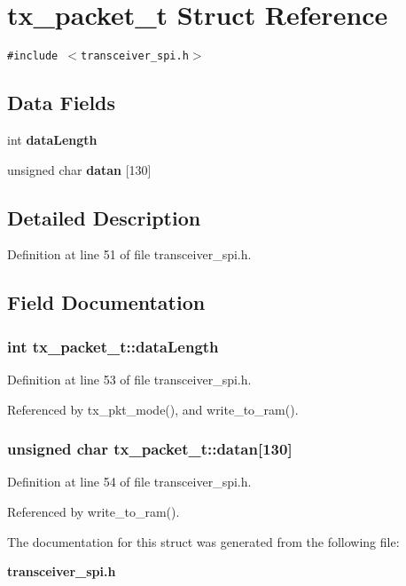 \section{tx\_\-packet\_\-t Struct Reference}
\label{structtx__packet__t}
{\tt \#include $<$transceiver\_\-spi.h$>$}

\subsection*{Data Fields}
\begin{CompactItemize}
\item 
int {\bf data\-Length}
\item 
unsigned char {\bf datan} [130]
\end{CompactItemize}


\subsection{Detailed Description}




Definition at line 51 of file transceiver\_\-spi.h.

\subsection{Field Documentation}
\subsubsection{\setlength{\rightskip}{0pt plus 5cm}int {\bf tx\_\-packet\_\-t::data\-Length}}\label{structtx__packet__t_1f14a5038a8cdc8ebc4d45e855f5921d}




Definition at line 53 of file transceiver\_\-spi.h.

Referenced by tx\_\-pkt\_\-mode(), and write\_\-to\_\-ram().
\subsubsection{\setlength{\rightskip}{0pt plus 5cm}unsigned char {\bf tx\_\-packet\_\-t::datan}[130]}\label{structtx__packet__t_a885bf0253e67c8d2ba5c592f04f711b}




Definition at line 54 of file transceiver\_\-spi.h.

Referenced by write\_\-to\_\-ram().

The documentation for this struct was generated from the following file:\begin{CompactItemize}
\item 
{\bf transceiver\_\-spi.h}\end{CompactItemize}
